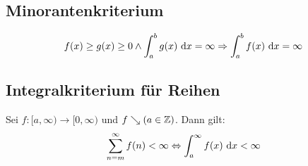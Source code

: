 \subsection{Minorantenkriterium}
\begin{equation*}
    f(x) \geq g(x) \geq 0 \land \int_a^b g(x) \text{ d}x = \infty
    \Rightarrow \int_a^b f(x) \text{ d}x = \infty
\end{equation*}

\subsection{Integralkriterium für Reihen}
Sei $f: [a, \infty) \rightarrow [0, \infty)$ und $f \searrow (a \in \mathbb{Z})$. Dann
gilt:
\begin{equation*}
    \sum_{n=m}^\infty f(n) < \infty \Leftrightarrow
    \int_a^\infty f(x) \text{ d}x < \infty
\end{equation*}
